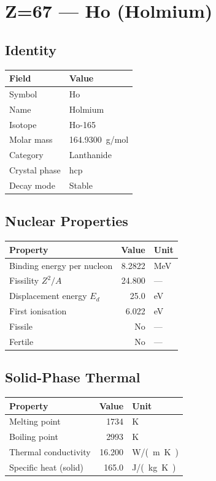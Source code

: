 \documentclass[11pt,a4paper]{article}
\begin{document}
\newpage

\section{Z=67 --- Ho (Holmium)}
\label{sec:Z67}

\subsection{Identity}
\begin{tabular}{ll}
  \toprule
  Field & Value \\
  \midrule
  Symbol & Ho \\
  Name & Holmium \\
  Isotope & Ho-165 \\
  Molar mass & \SI{164.9300}{g/mol} \\
  Category & Lanthanide \\
  Crystal phase & hcp \\
  Decay mode & Stable \\
  \bottomrule
\end{tabular}

\subsection{Nuclear Properties}
\begin{tabular}{lrl}
  \toprule
  Property & Value & Unit \\
  \midrule
  Binding energy per nucleon & 8.2822 & \si{MeV} \\
  Fissility $Z^2/A$ & 24.800 & --- \\
  Displacement energy $E_d$ & 25.0 & \si{eV} \\
  First ionisation & 6.022 & \si{eV} \\
  Fissile & No & --- \\
  Fertile & No & --- \\
  \bottomrule
\end{tabular}

\subsection{Solid-Phase Thermal}
\begin{tabular}{lrl}
  \toprule
  Property & Value & Unit \\
  \midrule
  Melting point & 1734 & \si{K} \\
  Boiling point & 2993 & \si{K} \\
  Thermal conductivity & 16.200 & \si{W/(m.K)} \\
  Specific heat (solid) & 165.0 & \si{J/(kg.K)} \\
  \bottomrule
\end{tabular}
\end{document}
